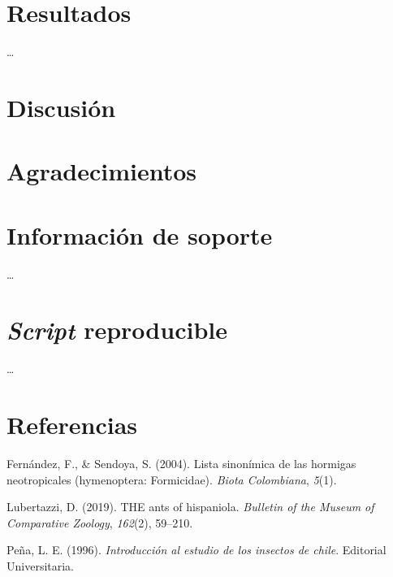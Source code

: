 \documentclass[11pt,]{article}
\begin{document}
\section{Resultados}\label{resultados}

\ldots

\section{Discusión}\label{discusiuxf3n}

\section{Agradecimientos}\label{agradecimientos}

\section{Información de soporte}\label{informaciuxf3n-de-soporte}

\ldots

\section{\texorpdfstring{\emph{Script}
reproducible}{Script reproducible}}\label{script-reproducible}

\ldots

\section*{Referencias}\label{referencias}

\hypertarget{refs}{}
\hypertarget{ref-fernandez2004lista}{}
Fernández, F., \& Sendoya, S. (2004). Lista sinonímica de las hormigas
neotropicales (hymenoptera: Formicidae). \emph{Biota Colombiana},
\emph{5}(1).

\hypertarget{ref-lubertazzi2019ants}{}
Lubertazzi, D. (2019). THE ants of hispaniola. \emph{Bulletin of the
Museum of Comparative Zoology}, \emph{162}(2), 59--210.

\hypertarget{ref-pena1996introduccion}{}
Peña, L. E. (1996). \emph{Introducción al estudio de los insectos de
chile}. Editorial Universitaria.




\newpage
\singlespacing 
\end{document}

